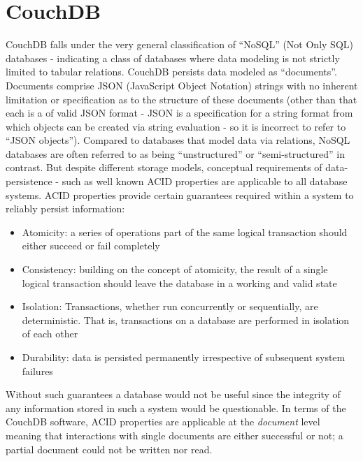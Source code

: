 \section{CouchDB}
CouchDB falls under the very general classification of ``NoSQL'' (Not Only SQL) databases - indicating a class of databases where data modeling is not strictly limited to tabular relations. CouchDB persists data modeled as ``documents''. Documents comprise JSON (JavaScript Object Notation) strings with no inherent limitation or specification as to the structure of these documents (other than that each is a of valid JSON format - JSON is a specification for a string format from which objects can be created via string evaluation - so it is incorrect to refer to ``JSON objects''). Compared to databases that model data via relations, NoSQL databases are often referred to as being ``unstructured'' or ``semi-structured'' in contrast. But despite different storage models, conceptual requirements of data-persistence - such as well known ACID properties are applicable to all database systems. ACID properties provide certain guarantees required within a system to reliably persist information:

\begin{itemize}
    \item Atomicity: a series of operations part of the same logical transaction should either succeed or fail completely
    \item Consistency: building on the concept of atomicity, the result of a single logical transaction should leave the database in a working and valid state
    \item Isolation: Transactions, whether run concurrently or sequentially, are deterministic. That is, transactions on a database are performed in isolation of each other
    \item Durability: data is persisted permanently irrespective of subsequent system failures
\end{itemize}

Without such guarantees a database would not be useful since the integrity of any information stored in such a system would be questionable. In terms of the CouchDB software, ACID properties are applicable at the \textit{document} level meaning that interactions with single documents are either successful or not; a partial document could not be written nor read.

